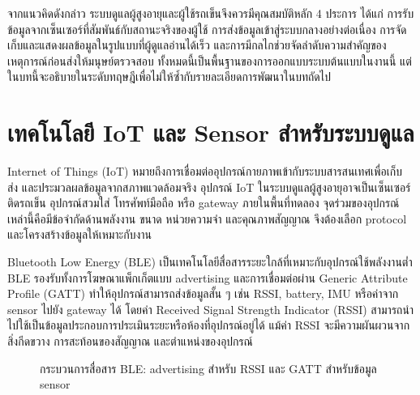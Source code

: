 จากแนวคิดดังกล่าว ระบบดูแลผู้สูงอายุและผู้ใช้รถเข็นจึงควรมีคุณสมบัติหลัก 4 ประการ ได้แก่ การรับข้อมูลจากเซ็นเซอร์ที่สัมพันธ์กับสถานะจริงของผู้ใช้ การส่งข้อมูลเข้าสู่ระบบกลางอย่างต่อเนื่อง การจัดเก็บและแสดงผลข้อมูลในรูปแบบที่ผู้ดูแลอ่านได้เร็ว และการมีกลไกช่วยจัดลำดับความสำคัญของเหตุการณ์ก่อนส่งให้มนุษย์ตรวจสอบ ทั้งหมดนี้เป็นพื้นฐานของการออกแบบระบบต้นแบบในงานนี้ แต่ในบทนี้จะอธิบายในระดับทฤษฎีเพื่อไม่ให้ซ้ำกับรายละเอียดการพัฒนาในบทถัดไป

\section{เทคโนโลยี IoT และ Sensor สำหรับระบบดูแล}
\label{sec:ch2_iot_sensor}

Internet of Things (IoT) หมายถึงการเชื่อมต่ออุปกรณ์กายภาพเข้ากับระบบสารสนเทศเพื่อเก็บ ส่ง และประมวลผลข้อมูลจากสภาพแวดล้อมจริง อุปกรณ์ IoT ในระบบดูแลผู้สูงอายุอาจเป็นเซ็นเซอร์ติดรถเข็น อุปกรณ์สวมใส่ โทรศัพท์มือถือ หรือ gateway ภายในพื้นที่ทดลอง จุดร่วมของอุปกรณ์เหล่านี้คือมีข้อจำกัดด้านพลังงาน ขนาด หน่วยความจำ และคุณภาพสัญญาณ จึงต้องเลือก protocol และโครงสร้างข้อมูลให้เหมาะกับงาน \cite{Atzori2010IoTSurvey}

Bluetooth Low Energy (BLE) เป็นเทคโนโลยีสื่อสารระยะใกล้ที่เหมาะกับอุปกรณ์ใช้พลังงานต่ำ BLE รองรับทั้งการโฆษณาแพ็กเก็ตแบบ advertising และการเชื่อมต่อผ่าน Generic Attribute Profile (GATT) ทำให้อุปกรณ์สามารถส่งข้อมูลสั้น ๆ เช่น RSSI, battery, IMU หรือค่าจาก sensor ไปยัง gateway ได้ โดยค่า Received Signal Strength Indicator (RSSI) สามารถนำไปใช้เป็นข้อมูลประกอบการประเมินระยะหรือห้องที่อุปกรณ์อยู่ได้ แม้ค่า RSSI จะมีความผันผวนจากสิ่งกีดขวาง การสะท้อนของสัญญาณ และตำแหน่งของอุปกรณ์ \cite{BluetoothSIGLEPrimer}

\begin{figure}[htbp]
    \centering
    \caption{กระบวนการสื่อสาร BLE: advertising สำหรับ RSSI และ GATT สำหรับข้อมูล sensor}
    \label{fig:ch2_ble_advertising_flow}
\end{figure}


